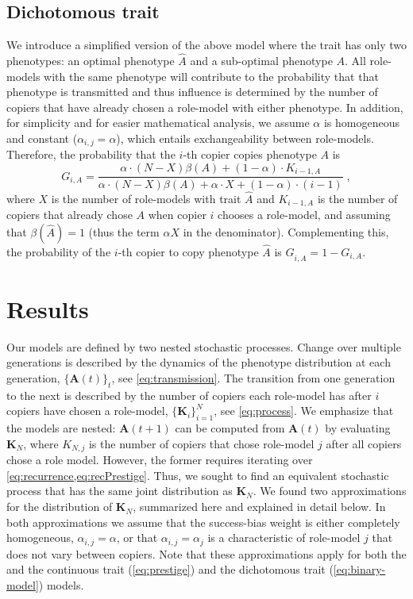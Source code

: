 \documentclass[12pt]{extarticle}
\let\vec\mathbf
\begin{document}
\subsection*{Dichotomous trait}
We introduce a simplified version of the above model where the trait has only two phenotypes: an optimal phenotype $\hat{A}$ and a sub-optimal phenotype $A$. 
All role-models with the same phenotype will contribute to the probability that that phenotype is transmitted and thus influence is determined by the number of copiers that have already chosen a role-model with either phenotype.
In addition, for simplicity and for easier mathematical analysis, we assume $\alpha$ is homogeneous and constant ($\alpha_{i,j}=\alpha$), which entails exchangeability between role-models.
Therefore, the probability that the $i$-th copier {copies} phenotype $A$ is
\begin{equation}\label{eq:binary-model}
G_{i,A} = \frac{\alpha \cdot (N-X) \beta(A) + (1-\alpha) \cdot K_{i-1,A}}{\alpha \cdot (N-X) \beta(A) + \alpha \cdot X + (1-\alpha)\cdot(i-1)} \;,
\end{equation}
where $X$ is the number of role-models with trait $\hat{A}$ and $K_{i-1,A}$ is the number of copiers that already chose $A$ when copier $i$ chooses a role-model, and assuming that $\beta(\hat{A})=1$ (thus the term $\alpha X$ in the denominator).
Complementing this, the probability of the $i$-th copier to copy phenotype $\hat{A}$ is $G_{i, \hat{A}} = 1-G_{i,A}$.


\section*{Results}
Our models are defined by two nested stochastic processes. Change over multiple generations is described by the {dynamics of the} phenotype distribution at each generation, $\{\vec{A}(t)\}_t$, see \cref{eq:transmission}. The transition from one generation to the next is described by the number of copiers each role-model has after $i$ copiers have chosen a role-model, $\{\vec{K}_i\}_{i=1}^N$, see \cref{eq:process}.
We emphasize that the models are nested: $\vec{A}(t+1)$ can be computed from $\vec{A}(t)$ by evaluating $\vec{K}_{N}$, where $K_{N,j}$ is the number of copiers that chose role-model $j$ after all copiers chose a role model.
However, the former requires iterating over \cref{eq:recurrence,eq:recPrestige}.
Thus, we sought to find an equivalent stochastic process that has the same joint distribution as $\vec{K}_{N}$. 
We found two approximations for the distribution of $\vec{K}_{N}$, summarized here and explained in detail below.
In both approximations we assume that the success-bias weight is either completely homogeneous, $\alpha_{i,j}=\alpha$, or that $\alpha_{i,j}=\alpha_j$ is a characteristic of role-model $j$ that does not vary between copiers.
Note that these approximations apply for both the and the continuous trait (\cref{eq:prestige}) and the dichotomous trait (\cref{eq:binary-model}) models.
\end{document}
